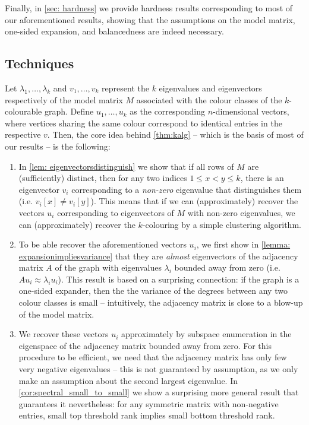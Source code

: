 Finally, in \cref{sec: hardness} we provide hardness results corresponding to most of our aforementioned results, showing that the assumptions on the model matrix, one-sided expansion, and balancedness are indeed necessary.

\subsection{Techniques}

Let $\lambda_1, \ldots, \lambda_k$ and $v_1, \ldots, v_k$ represent the $k$ eigenvalues and eigenvectors respectively of the model matrix $M$ associated with the colour classes of the $k$-colourable graph. Define $u_1, \ldots, u_k$ as the corresponding $n$-dimensional vectors, where vertices sharing the same colour correspond to identical entries in the respective $v$. Then, the core idea behind \cref{thm:kalg} -- which is the basis of most of our results -- is the following:

\begin{enumerate}
    \item In \cref{lem: eigenvectorsdistinguish} we show that if all rows of $M$ are (sufficiently) distinct, then for any two indices $1\leq x<y\leq k$, there is an eigenvector $v_i$ corresponding to a \textit{non-zero} eigenvalue that distinguishes them (i.e. $v_i[x]\neq v_i[y]$). This means that if we can (approximately) recover the vectors $u_i$ corresponding to eigenvectors of $M$ with non-zero eigenvalues, we can (approximately) recover the $k$-colouring by a simple clustering algorithm.
    \item To be able recover the aforementioned vectors $u_i$, we first show in \cref{lemma: expansionimpliesvariance} that they are \textit{almost} eigenvectors of the adjacency matrix $A$ of the graph with eigenvalues $\lambda_i$ bounded away from zero (i.e. $Au_i\approx \lambda_i u_i$). This result is based on a surprising connection: if the graph is a one-sided expander, then the the variance of the degrees between any two colour classes is small -- intuitively, the adjacency matrix is close to a blow-up of the model matrix.
    \item We recover these vectors $u_i$ approximately by subspace enumeration in the eigenspace of the adjacency matrix bounded away from zero. For this procedure to be efficient, we need that the adjacency matrix has only few very negative eigenvalues -- this is not guaranteed by assumption, as we only make an assumption about the second largest eigenvalue. In \cref{cor:spectral_small_to_small} we show a surprising more general result that guarantees it nevertheless: for any symmetric matrix with non-negative entries, small top threshold rank implies small bottom threshold rank.
\end{enumerate}


